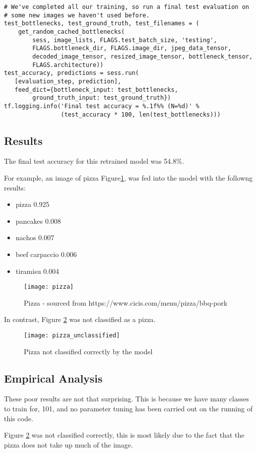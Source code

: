 \begin{lstlisting}[style=Python]
# We've completed all our training, so run a final test evaluation on
# some new images we haven't used before.
test_bottlenecks, test_ground_truth, test_filenames = (
    get_random_cached_bottlenecks(
        sess, image_lists, FLAGS.test_batch_size, 'testing',
        FLAGS.bottleneck_dir, FLAGS.image_dir, jpeg_data_tensor,
        decoded_image_tensor, resized_image_tensor, bottleneck_tensor,
        FLAGS.architecture))
test_accuracy, predictions = sess.run(
   [evaluation_step, prediction],
   feed_dict={bottleneck_input: test_bottlenecks,
        ground_truth_input: test_ground_truth})
tf.logging.info('Final test accuracy = %.1f%% (N=%d)' %
                (test_accuracy * 100, len(test_bottlenecks)))
\end{lstlisting}

\subsection*{Results}
The final test accuracy for this retrained model was 54.8\%.

For example, an image of pizza Figure\ref{fig:pizza}, was fed into the model with the followng results:
\begin{itemize}
    \item{pizza 0.925}
    \item{pancakes 0.008}
    \item{nachos 0.007}
    \item{beef carpaccio 0.006}
    \item{tiramisu 0.004}
\end{itemize}

\begin{figure}
     \texttt{[image: pizza]}
     \caption{Pizza - sourced from https://www.cicis.com/menu/pizza/bbq-pork}
     \label{fig:pizza}
\end{figure}

In contrast, Figure \ref{fig:pizza_unclassified} was not classified as a pizza.

\begin{figure}
     \texttt{[image: pizza\_unclassified]}
     \caption{Pizza not classified correctly by the model}
     \label{fig:pizza_unclassified}
\end{figure}

\subsection*{Empirical Analysis}
These poor results are not that surprising.
This is because we have many classes to train for, 101, and no parameter tuning has been carried out on the running of this code.

Figure \ref{fig:pizza_unclassified} was not classified correctly, this is most likely due to the fact that the pizza does not take up much of the image.

